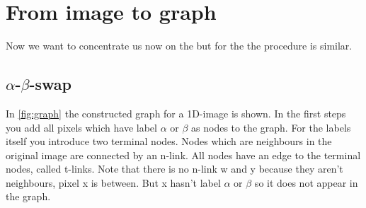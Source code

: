 \documentclass[runningheads,a4paper]{llncs}
\begin{document}
\section{From image to graph}
    \label{sec:imgtograph}
    Now we want to concentrate us now on the \abswap but for the \aexp the procedure is similar.
    \subsection{$\alpha$-$\beta$-swap}
        In \autoref{fig:graph} the constructed graph for a 1D-image is shown. In the first steps you add all pixels which have label $\alpha$ or $\beta$ as nodes to the graph. For the labels itself 
        you introduce two terminal nodes. Nodes which are neighbours in the original image are connected by an n-link. All nodes have an edge to the terminal nodes, called t-links. Note that there is no n-link w and y because they
        aren't neighbours, pixel x is between. But x hasn't label $\alpha$ or $\beta$ so it does not appear in the graph.
\end{document}
